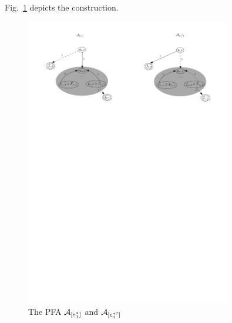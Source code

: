 Fig.~\ref{fig-reg2pfa-3} depicts the construction. 
\begin{figure}[ht]
	\centering
	\includegraphics[width = 0.8\textwidth]{reg2pfa-3.pdf}
	\caption{The PFA $\mathcal{A}_{[e_1^\ast]}$ and $\mathcal{A}_{[e_1^{\ast?}]}$}
	\label{fig-reg2pfa-3}
\end{figure}


